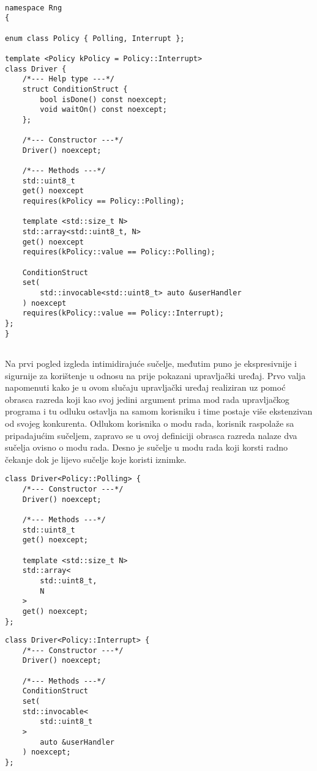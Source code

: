 \begin{lstlisting}

namespace Rng
{

enum class Policy { Polling, Interrupt };

template <Policy kPolicy = Policy::Interrupt>
class Driver {
    /*--- Help type ---*/
    struct ConditionStruct {
        bool isDone() const noexcept;
        void waitOn() const noexcept;
    };

    /*--- Constructor ---*/
    Driver() noexcept;

    /*--- Methods ---*/
    std::uint8_t 
    get() noexcept 
    requires(kPolicy == Policy::Polling);
    
    template <std::size_t N>
    std::array<std::uint8_t, N> 
    get() noexcept 
    requires(kPolicy::value == Policy::Polling);

    ConditionStruct 
    set(
        std::invocable<std::uint8_t> auto &userHandler
    ) noexcept
    requires(kPolicy::value == Policy::Interrupt);
};
}
              
\end{lstlisting}
Na prvi pogled izgleda intimidirajuće sučelje, međutim puno je ekspresivnije i sigurnije za korištenje u odnosu na prije pokazani upravljački uređaj. Prvo valja napomenuti kako je u ovom slučaju upravljački uređaj realiziran uz pomoć obrasca razreda koji kao svoj jedini argument prima mod rada upravljačkog programa i tu odluku ostavlja na samom korisniku i time postaje više ekstenzivan od svojeg konkurenta. Odlukom korisnika o modu rada, korisnik raspolaže sa pripadajućim sučeljem, zapravo se u ovoj definiciji obrasca razreda nalaze dva sučelja ovisno o modu rada. Desno je sučelje u modu rada koji korsti radno čekanje dok je lijevo sučelje koje koristi iznimke.
\pagebreak
\begin{multicols}{2}
\lstset{language=C, tabsize=2, frame=single, breaklines=true, showstringspaces=false, basicstyle=\small}
\begin{lstlisting}    
class Driver<Policy::Polling> {
    /*--- Constructor ---*/
    Driver() noexcept;

    /*--- Methods ---*/
    std::uint8_t 
    get() noexcept;
    
    template <std::size_t N>
    std::array<
        std::uint8_t, 
        N
    > 
    get() noexcept;
};
\end{lstlisting}
\columnbreak
\lstset{language=C++, tabsize=1, frame=single, breaklines=true, showstringspaces=false, basicstyle=\small}
\begin{lstlisting}    
class Driver<Policy::Interrupt> {
    /*--- Constructor ---*/
    Driver() noexcept;

    /*--- Methods ---*/
    ConditionStruct 
    set(
    std::invocable<
        std::uint8_t
    >
        auto &userHandler
    ) noexcept;
};
\end{lstlisting}
\end{multicols}
